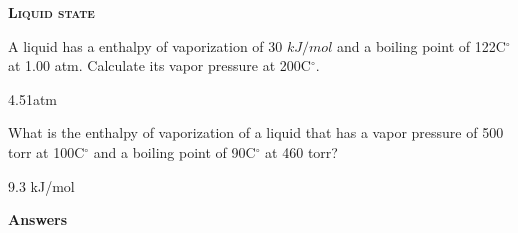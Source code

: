 \documentclass[main.tex]{subfiles}
\begin{document}
\begin{multicols*}{2}
{\raggedright\textsc{\textbf{Liquid state }}\par}
%

\begin{question}[ID=\the\value{numA}]
A liquid has a  enthalpy of vaporization of 30 $kJ/mol$ and a boiling point of 122C$^{\circ}$ at 1.00 atm. Calculate its vapor pressure at 200C$^{\circ}$.
\end{question}
\begin{solution}
4.51atm
 \hspace{0.1cm}\end{solution}
\begin{question}[ID=\the\value{numA}]
What is the  enthalpy of vaporization of a liquid that has a vapor pressure of 500 torr at 100C$^{\circ}$ and a boiling point of 90C$^{\circ}$ at 460 torr?
\end{question}
\begin{solution}
9.3 kJ/mol
 \hspace{0.1cm}\end{solution}





\end{multicols*}
\newpage
\begin{answersenvironment}
\begin{minipage}[c]{1\textwidth}
\begin{localsize}{10}
{\Large \bf Answers}
\printsolutions[byID={1,3,5,7,9,11,13,15,17}]
\end{localsize}
\end{minipage}\end{answersenvironment}
\end{document}
